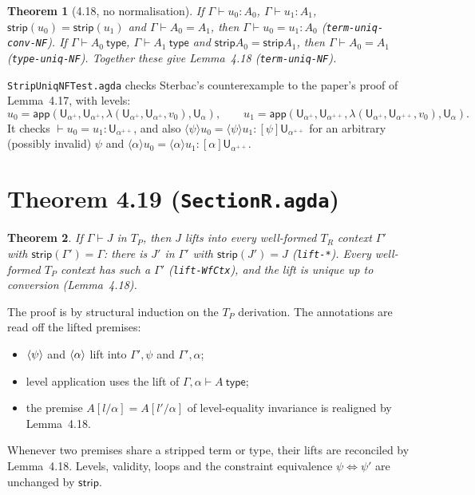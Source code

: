 \documentclass[10pt]{article}
\newcommand{\U}{\mathsf{U}}
\newcommand{\lam}{\lambda}
\newcommand{\app}{\mathsf{app}}
\newcommand{\strip}{\mathsf{strip}}
\newcommand{\ty}{\ \mathsf{type}}
\newcommand{\TR}{T_R}
\newcommand{\TP}{T_P}
\newcommand{\grd}[2]{[#1]#2}
\newcommand{\glam}[2]{\langle #1\rangle #2}
\newcommand{\lpi}[1]{[\alpha]#1}
\newcommand{\llam}[1]{\langle\alpha\rangle #1}
\newcommand{\agda}[1]{\texttt{#1}}
\newtheorem{theorem}{Theorem}
\theoremstyle{remark}
\begin{document}
\begin{theorem}[4.18, no normalisation]
If $\Gamma\vdash u_0:A_0$, $\Gamma\vdash u_1:A_1$, $\strip(u_0)=\strip(u_1)$
and $\Gamma\vdash A_0=A_1$, then $\Gamma\vdash u_0=u_1:A_0$
(\agda{term-uniq-conv-NF}).  If $\Gamma\vdash A_0\ty$, $\Gamma\vdash A_1\ty$
and $\strip A_0=\strip A_1$, then $\Gamma\vdash A_0=A_1$ (\agda{type-uniq-NF}).
Together these give Lemma~4.18 (\agda{term-uniq-NF}).
\end{theorem}
\noindent
\agda{StripUniqNFTest.agda} checks Sterbac's counterexample to the paper's
proof of Lemma~4.17, with levels:
\[
u_0=\app(\U_{\alpha^+},\U_{\alpha^+},\lam(\U_{\alpha^+},\U_{\alpha^+},v_0),\U_\alpha),\qquad
u_1=\app(\U_{\alpha^+},\U_{\alpha^{++}},\lam(\U_{\alpha^+},\U_{\alpha^{++}},v_0),\U_\alpha).
\]
It checks $\vdash u_0=u_1:\U_{\alpha^{++}}$, and also
$\glam\psi u_0=\glam\psi u_1:\grd\psi\U_{\alpha^{++}}$ for an arbitrary
(possibly invalid) $\psi$ and $\llam u_0=\llam u_1:\lpi{\U_{\alpha^{++}}}$.

\section{Theorem 4.19 (\agda{SectionR.agda})}

\begin{theorem}
If $\Gamma\vdash J$ in $\TP$, then $J$ lifts into \emph{every} well-formed
$\TR$ context $\Gamma'$ with $\strip(\Gamma')=\Gamma$: there is $J'$ in
$\Gamma'$ with $\strip(J')=J$ (\agda{lift-*}).  Every well-formed $\TP$
context has such a $\Gamma'$ (\agda{lift-WfCtx}), and the lift is unique up
to conversion (Lemma~4.18).
\end{theorem}
\noindent
The proof is by structural induction on the $\TP$ derivation.  The
annotations are read off the lifted premises:
\begin{itemize}
\item $\glam\psi$ and $\llam$ lift into $\Gamma',\psi$ and $\Gamma',\alpha$;
\item level application uses the lift of $\Gamma,\alpha\vdash A\ty$;
\item the premise $A[l/\alpha]=A[l'/\alpha]$ of level-equality invariance is
  realigned by Lemma~4.18.
\end{itemize}
Whenever two premises share a stripped term or type, their lifts are
reconciled by Lemma~4.18.  Levels, validity, loops and the constraint
equivalence $\psi\Leftrightarrow\psi'$ are unchanged by $\strip$.
\end{document}
